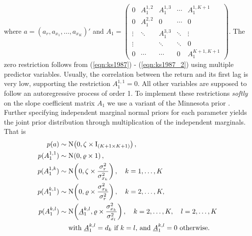 where $a=(a_r,a_{x_1},\ldots,a_{x_K})'$ and $A_1=\begin{pmatrix} 0 & A_1^{1,2}& A_1^{1,3}&\cdots  & A_1^{1,K+1}\\0 & A_1^{2,2} &0& \cdots & 0\\ \vdots&\ddots&A_1^{3,3}&\ddots& \vdots\\\vdots&&\ddots&\ddots&0\\0&\cdots&\cdots&0&A_1^{K+1,K+1}\end{pmatrix}$. The zero restriction follows from (\ref{eqn:ks1987}) - (\ref{eqn:ks1987_2}) using multiple predictor variables. Usually, the correlation between the return and its first lag is very low, supporting the restriction $A_1^{1,1}=0$. All other variables are supposed to follow an autoregressive process of order 1. To implement these restrictions \textit{softly} on the slope coefficient matrix $A_1$%
we use a variant of the Minnesota prior \citep{doan1984}. Further specifying independent marginal normal priors for each parameter yields the joint prior distribution through multiplication of the independent marginals. That is
\begin{align}\label{eqn:priora}
	p(a)&\sim\No{0,\zeta\times\text{I}_{(K+1\times K+1)}},\\\label{eqn:priorA11}
	p(A_1^{1,1}) &\sim \No{0,\varrho\times1},\\\label{eqn:priorA1k}
	p(A_1^{1,k}) &\sim \No{0,\zeta\times \frac{\sigma_r^2}{\sigma_{x_k}^2}},\quad k=1,\ldots,K\\\label{eqn:priorAk1}
	p(A_1^{k,1}) &\sim \No{0,\varrho\times \frac{\sigma_{x_k}^2}{\sigma_{r}^2}},\quad k=2,\ldots,K,\\\label{eqn:priorAkl}
	p(A_1^{k,l}) &\sim \No{\underline{A}_1^{k,l},\varrho\times \frac{\sigma_{x_k}^2}{\sigma_{x_l}^2}},\quad k=2,\ldots,K,\quad l=2,\ldots,K\\
	&  \quad\,\,\text{with } \underline{A}_1^{k,l} = d_k \text{ if $k=l$, and $\underline{A}_1^{k,l} = 0$ otherwise.} \nonumber
\end{align}
